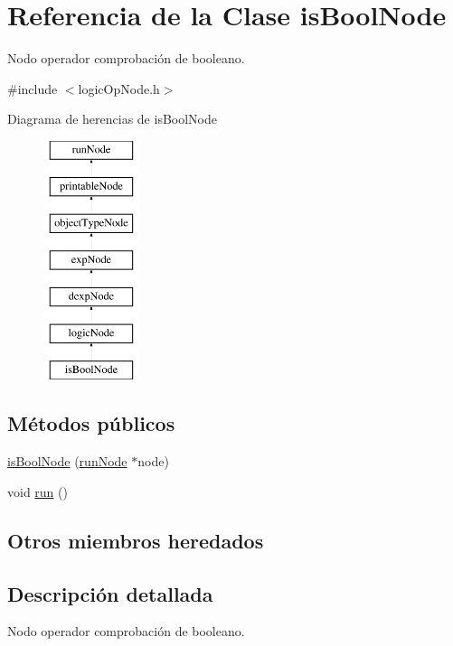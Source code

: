 \hypertarget{classisBoolNode}{\section{Referencia de la Clase is\-Bool\-Node}
\label{classisBoolNode}
}


Nodo operador comprobación de booleano.  




{\ttfamily \#include $<$logic\-Op\-Node.\-h$>$}

Diagrama de herencias de is\-Bool\-Node\begin{figure}[H]
\begin{center}
\leavevmode
\includegraphics[height=7.000000cm]{classisBoolNode}
\end{center}
\end{figure}
\subsection*{Métodos públicos}
\begin{DoxyCompactItemize}
\item 
\hyperlink{classisBoolNode_a9bcee62d1c853c9357a88ccf169ad918}{is\-Bool\-Node} (\hyperlink{classrunNode}{run\-Node} $\ast$node)
\item 
void \hyperlink{classisBoolNode_acf758fab0546f592da7115ebe7fbb46c}{run} ()
\end{DoxyCompactItemize}
\subsection*{Otros miembros heredados}


\subsection{Descripción detallada}
Nodo operador comprobación de booleano. 

